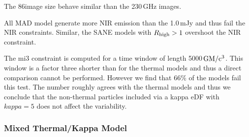 
The 86\GHz image size behave similar than the 230\,GHz images.


All MAD model generate more NIR emission than the 1.0\,mJy and thus fail the NIR constraints. Similar, the SANE models with $R_{\rm high}>1$ overshoot the NIR constraint.


The mi3 constraint is computed for a time window of length 5000\,$\rm{GM/c^3}$. This window is a factor three shorter than for the thermal models and thus a direct comparison cannot be performed. However we find that 66\% of the models fail this test. The number roughly agrees with the thermal models and thus we conclude that the non-thermal particles included via a kappa eDF with $kappa=5$ does not affect the variability.





\subsubsection{Mixed Thermal/Kappa Model}

